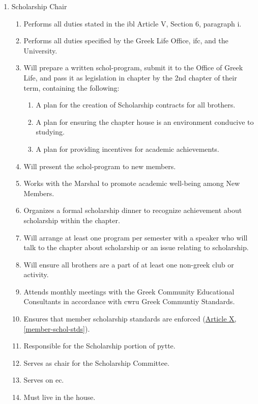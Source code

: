 \begin{enumerate}
		\item Scholarship Chair \label{schol-chair-duties}
			\begin{enumerate}
				\item Performs all duties stated in the \gls{ibl} Article V, Section 6, paragraph i.
				\item Performs all duties specified by the Greek Life Office, \gls{ifc}, and the University.
				\item Will prepare a written \gls{schol-program}, submit it to the Office of Greek Life, and pass it as legislation in chapter by the 2nd chapter of their term, containing the following:
				\begin{enumerate}
					\item A plan for the creation of Scholarship contracts for all brothers.
					\item A plan for ensuring the chapter house is an environment conducive to studying.
					\item A plan for providing incentives for academic achievements.
				\end{enumerate}
				\item Will present the \gls{schol-program} to new members.
				\item Works with the Marshal to promote academic well-being among New Members.
                		\item Organizes a formal scholarship dinner to recognize achievement about scholarship within the chapter.
				\item Will arrange at least one program per semester with a speaker who will talk to the chapter about scholarship or an issue relating to scholarship.
				\item Will ensure all brothers are a part of at least one non-greek club or activity.
				\item Attends monthly meetings with the Greek Community Educational Consultants in accordance with \gls{cwru} Greek Communtiy Standards.
				\item Ensures that member scholarship standards are enforced (\hyperref[member-schol-stds]{Article X, \autoref*{member-schol-stds}}).
				\item Responsible for the Scholarship portion of \gls{pytte}.
                \item Serves as chair for the Scholarship Committee.
                \item Serves on \gls{ec}.
                \item Must live in the house.
			\end{enumerate}



\end{enumerate}
